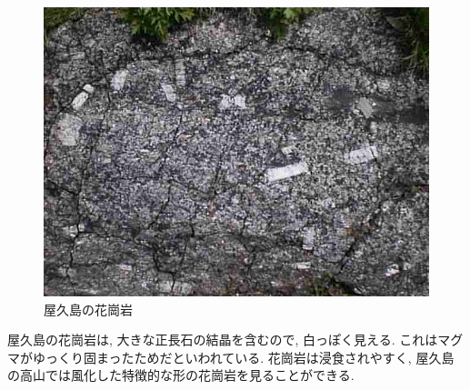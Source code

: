 \documentclass[10pt,titlepage,a5paper]{ltjsbook}
\begin{document}
    \begin{tcolorbox}[title=コラム:屋久島の花崗岩,width=\textwidth]
      \begin{minipage}{0.34\columnwidth}
        \begin{figure}[H]
          \centering
          \includegraphics[width=\columnwidth]{kakougan.jpg}
          \caption{屋久島の花崗岩}
          \label{fig:yakushima_granite}
        \end{figure}
      \end{minipage}
      \hfill
      \begin{minipage}{0.64\columnwidth}
      屋久島の花崗岩は, 大きな正長石の結晶を含むので, 白っぽく見える. これはマグマがゆっくり固まったためだといわれている. 花崗岩は浸食されやすく, 屋久島の高山では風化した特徴的な形の花崗岩\footnotemark を見ることができる. 
      \end{minipage}
    \end{tcolorbox}
\end{document}
